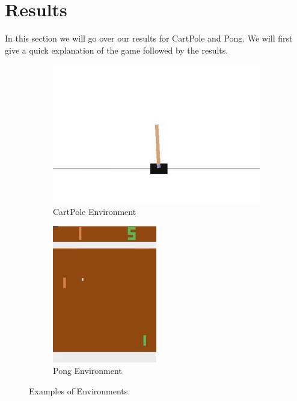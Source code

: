 \documentclass{article}
\begin{document}
%




\section{Results}
In this section we will go over our results for CartPole and Pong. We will first give a quick explanation of the game followed by the results.


\begin{figure}[H]
\centering
\begin{subfigure}{0.45\textwidth}
\centering
\includegraphics[width=\textwidth]{images/cartpole.PNG}
\caption{CartPole Environment}
\label{fig:cartpole}
\end{subfigure}
\begin{subfigure}{0.45\textwidth}
\centering
\includegraphics[width=0.5\textwidth]{images/pong.png}
\caption{Pong Environment}
\label{fig:pong}
\end{subfigure}
\caption{Examples of Environments}
\end{figure}
\end{document}

